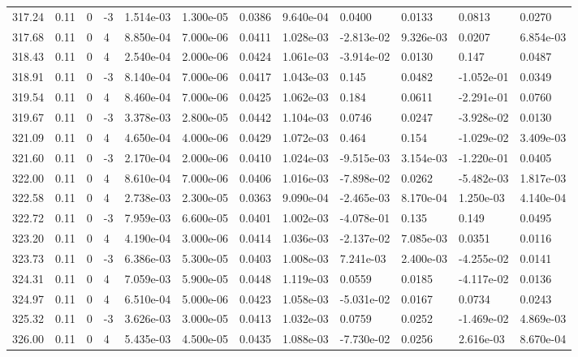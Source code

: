 \documentclass[preview]{standalone}
\begin{document}
{{{{{{{{{{{{{{{\begin{tabular}{L{1.2cm}C{1.2cm} C{0.3cm}C{0.5cm} C{1.4cm}C{1.4cm} C{1.4cm}C{1.4cm} C{1.6cm}C{1.6cm} C{1.6cm}C{1.6cm}}
  317.24  &  0.11  & 0     & -3 &  1.514e-03  & 1.300e-05  &  0.0386&   9.640e-04& 0.0400 & 0.0133   &  0.0813 & 0.0270  \\ 
  317.68  &  0.11  & 0     &  4 &  8.850e-04  & 7.000e-06  &  0.0411&   1.028e-03& -2.813e-02 & 9.326e-03   &  0.0207 & 6.854e-03  \\ 
  318.43  &  0.11  & 0     &  4 &  2.540e-04  & 2.000e-06  &  0.0424&   1.061e-03& -3.914e-02 & 0.0130   &  0.147 & 0.0487  \\ 
  318.91  &  0.11  & 0     & -3 &  8.140e-04  & 7.000e-06  &  0.0417&   1.043e-03& 0.145 & 0.0482   &  -1.052e-01 & 0.0349  \\ 
  319.54  &  0.11  & 0     &  4 &  8.460e-04  & 7.000e-06  &  0.0425&   1.062e-03& 0.184 & 0.0611   &  -2.291e-01 & 0.0760  \\ 
  319.67  &  0.11  & 0     & -3 &  3.378e-03  & 2.800e-05  &  0.0442&   1.104e-03& 0.0746 & 0.0247   &  -3.928e-02 & 0.0130  \\ 
  321.09  &  0.11  & 0     &  4 &  4.650e-04  & 4.000e-06  &  0.0429&   1.072e-03& 0.464 & 0.154   &  -1.029e-02 & 3.409e-03  \\ 
  321.60  &  0.11  & 0     & -3 &  2.170e-04  & 2.000e-06  &  0.0410&   1.024e-03& -9.515e-03 & 3.154e-03   &  -1.220e-01 & 0.0405  \\ 
  322.00  &  0.11  & 0     &  4 &  8.610e-04  & 7.000e-06  &  0.0406&   1.016e-03& -7.898e-02 & 0.0262   &  -5.482e-03 & 1.817e-03  \\ 
  322.58  &  0.11  & 0     &  4 &  2.738e-03  & 2.300e-05  &  0.0363&   9.090e-04& -2.465e-03 & 8.170e-04   &  1.250e-03 & 4.140e-04  \\ 
  322.72  &  0.11  & 0     & -3 &  7.959e-03  & 6.600e-05  &  0.0401&   1.002e-03& -4.078e-01 & 0.135   &  0.149 & 0.0495  \\ 
  323.20  &  0.11  & 0     &  4 &  4.190e-04  & 3.000e-06  &  0.0414&   1.036e-03& -2.137e-02 & 7.085e-03   &  0.0351 & 0.0116  \\ 
  323.73  &  0.11  & 0     & -3 &  6.386e-03  & 5.300e-05  &  0.0403&   1.008e-03& 7.241e-03 & 2.400e-03   &  -4.255e-02 & 0.0141  \\ 
  324.31  &  0.11  & 0     &  4 &  7.059e-03  & 5.900e-05  &  0.0448&   1.119e-03& 0.0559 & 0.0185   &  -4.117e-02 & 0.0136  \\ 
  324.97  &  0.11  & 0     &  4 &  6.510e-04  & 5.000e-06  &  0.0423&   1.058e-03& -5.031e-02 & 0.0167   &  0.0734 & 0.0243  \\ 
  325.32  &  0.11  & 0     & -3 &  3.626e-03  & 3.000e-05  &  0.0413&   1.032e-03& 0.0759 & 0.0252   &  -1.469e-02 & 4.869e-03  \\ 
  326.00  &  0.11  & 0     &  4 &  5.435e-03  & 4.500e-05  &  0.0435&   1.088e-03& -7.730e-02 & 0.0256   &  2.616e-03 & 8.670e-04  \\ 
\hline 
\end{tabular} 

}}}}}}}}}}}}}}}
\end{document}
